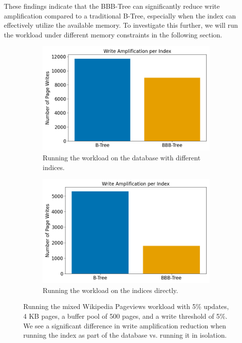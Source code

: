 These findings indicate that the BBB-Tree can significantly reduce write amplification compared to a traditional B-Tree, especially when the index can effectively utilize the available memory.
To investigate this further, we will run the workload under different memory constraints in the following section.

\begin{figure}[htbp]
  \centering
  \begin{subfigure}[b]{0.49\textwidth}
    \centering
    \includegraphics[width=\textwidth]{figures/evaluation/pageviews_mixed_db.png}
    \caption{Running the workload on the database with different indices.}
    \label{fig:sub1}
  \end{subfigure}
  \hfill
  \begin{subfigure}[b]{0.49\textwidth}
    \centering
    \includegraphics[width=\textwidth]{figures/evaluation/pageviews_mixed_index.png}
    \caption{Running the workload on the indices directly.}
    \label{fig:sub2}
  \end{subfigure}
  \caption{Running the mixed Wikipedia Pageviews workload with 5\% updates, 4 KB pages, a buffer pool of 500 pages, and a write threshold of 5\%. We see a significant difference in write amplification reduction when running the index as part of the database vs. running it in isolation.}
  \label{fig:both}
\end{figure}

